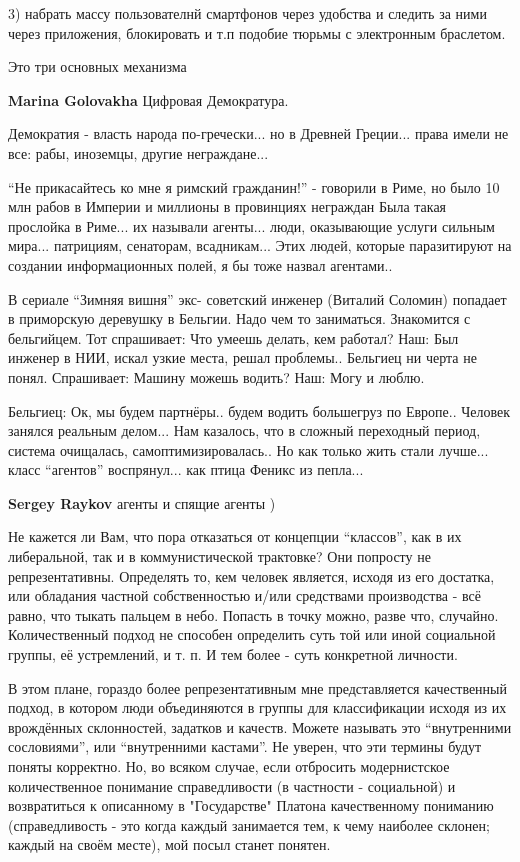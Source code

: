 \begin{itemize}
3) набрать массу пользователнй смартфонов через удобства и следить за ними
через приложения, блокировать и т.п подобие тюрьмы с электронным браслетом.

Это три основных механизма

\textbf{Marina Golovakha} Цифровая Демократура.


Демократия - власть народа по-гречески... но в Древней Греции... права имели
не все: рабы, иноземцы, другие неграждане...

\enquote{Не прикасайтесь ко мне я римский гражданин!} - говорили в Риме, но
было 10 млн рабов в Империи и миллионы в провинциях неграждан Была такая
прослойка в Риме... их называли агенты... люди, оказывающие услуги сильным
мира...  патрициям, сенаторам, всадникам...  Этих людей, которые паразитируют
на создании информационных полей, я бы тоже назвал агентами..

В сериале \enquote{Зимняя вишня} экс- советский инженер (Виталий Соломин) попадает в
приморскую деревушку в Бельгии. Надо чем то заниматься. Знакомится с
бельгийцем. Тот спрашивает: Что умеешь делать, кем работал? Наш: Был инженер в
НИИ, искал узкие места, решал проблемы.. Бельгиец ни черта не понял. Спрашивает:
Машину можешь водить? Наш: Могу и люблю.

Бельгиец: Ок, мы будем партнёры.. будем водить большегруз по Европе..
Человек занялся реальным делом...
Нам казалось, что в сложный переходный период, система очищалась, самоптимизировалась..
Но как только жить стали лучше... класс \enquote{агентов} воспрянул... как птица Феникс из пепла...

\textbf{Sergey Raykov} агенты и спящие агенты )


Не кажется ли Вам, что пора отказаться от концепции \enquote{классов}, как в их
либеральной, так и в коммунистической трактовке? Они попросту не
репрезентативны. Определять то, кем человек является, исходя из его достатка,
или обладания частной собственностью и/или средствами производства - всё равно,
что тыкать пальцем в небо. Попасть в точку можно, разве что, случайно.
Количественный подход не способен определить суть той или иной социальной
группы, её устремлений, и т. п. И тем более - суть конкретной личности.

В этом плане, гораздо более репрезентативным мне представляется качественный
подход, в котором люди объединяются в группы для классификации исходя из их
врождённых склонностей, задатков и качеств. Можете называть это \enquote{внутренними
сословиями}, или \enquote{внутренними кастами}. Не уверен, что эти термины будут поняты
корректно. Но, во всяком случае, если отбросить модернистское количественное
понимание справедливости (в частности - социальной) и возвратиться к описанному
в "Государстве" Платона качественному пониманию (справедливость - это когда
каждый занимается тем, к чему наиболее склонен; каждый на своём месте), мой
посыл станет понятен.


\end{itemize}
